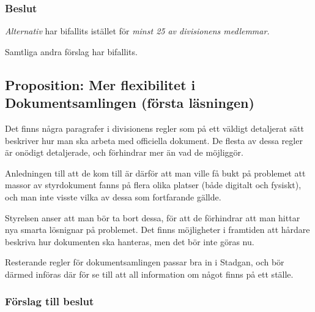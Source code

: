 \documentclass[protokoll]{dvd}
\begin{document}
\subsubsection{Beslut}
\begin{attsatser}
        \item \emph{Alternativ} har bifallits istället för \emph{minst 25 av divisionens medlemmar.}
	\item Samtliga andra förslag har bifallits.
\end{attsatser}


\newpage
\subsection{Proposition: Mer flexibilitet i Dokumentsamlingen (första läsningen)}

Det finns några paragrafer i divisionens regler som på ett väldigt detaljerat sätt beskriver hur man ska arbeta med officiella dokument.
De flesta av dessa regler är onödigt detaljerade, och förhindrar mer än vad de möjliggör.

Anledningen till att de kom till är därför att man ville få bukt på problemet att massor av styrdokument fanns på flera olika platser (både digitalt och fysiskt), och man inte visste vilka av dessa som fortfarande gällde.

Styrelsen anser att man bör ta bort dessa, för att de förhindrar att man hittar nya smarta lösnignar på problemet.
Det finns möjligheter i framtiden att hårdare beskriva hur dokumenten ska hanteras, men det bör inte göras nu.

Resterande regler för dokumentsamlingen passar bra in i Stadgan, och bör därmed införas där för se till att all information om något finns på ett ställe.

\subsubsection*{Förslag till beslut}
\end{document}
